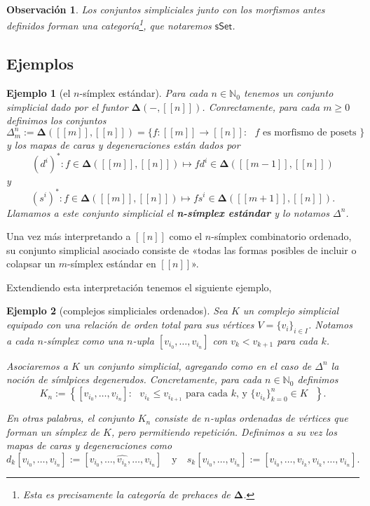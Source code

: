 \documentclass[11pt]{report}
\theoremstyle{colored}
\newtheorem{remark}{Observación}[section]
\newtheorem{example}{Ejemplo}[section]
\newcommand{\N}{\mathbb{N}}
\newcommand{\nat}[1]{[\![#1]\!]}
\newcommand{\ord}[1]{\nat{#1}}
\newcommand{\cat}[1]{\mathsf{#1}}
\renewcommand{\ss}[1]{\Delta^{#1}}
\newcommand{\ordcat}{\boldsymbol{\Delta}}
\begin{document}
\begin{remark} Los conjuntos simpliciales junto con los morfismos antes definidos forman una categoría\footnote{Esta es precisamente la categoría de prehaces de $\ordcat$.}, que notaremos $\cat{sSet}$.
\end{remark}

\subsection{Ejemplos}

\begin{example}[el $n$-símplex estándar] Para cada $n \in \N_0$ tenemos un conjunto simplicial dado por el funtor $\ordcat(-,\ord{n})$. Conrectamente, para cada $m \geq 0$ definimos los conjuntos
\[
\ss{n}_m := \ordcat(\ord{m},\ord{n}) = \{f : \ord{m} \to \ord{n} : \text{ $f$ es morfismo de posets } \}
\]
y los mapas de caras y degeneraciones están dados por
\[
(d^i)^* : f \in \ordcat(\ord{m},\ord{n}) \mapsto fd^i \in \ordcat(\ord{m-1},\ord{n})
\]
y
\[
(s^i)^* : f \in \ordcat(\ord{m},\ord{n}) \mapsto fs^i \in \ordcat(\ord{m+1},\ord{n}).
\]
Llamamos a este conjunto simplicial el \textbf{n-símplex estándar} y lo notamos $\ss{n}$.
\end{example}

Una vez más interpretando a $\ord{n}$ como el $n$-símplex combinatorio ordenado, su conjunto simplicial asociado consiste de «todas las formas posibles de incluir o colapsar un $m$-símplex estándar en $\nat{n}$».

Extendiendo esta interpretación tenemos el siguiente ejemplo,

\begin{example}[complejos simpliciales ordenados] Sea $K$ un complejo simplicial equipado con una relación de orden total para sus vértices $V = \{v_i\}_{i \in I}$. Notamos a cada $n$-símplex como una $n$-upla $[v_{i_0},\dots, v_{i_n}]$ con $v_k < v_{k+1}$ para cada $k$.

Asociaremos a $K$ un conjunto simplicial, agregando como en el caso de $\ss{n}$ la noción de \textit{símlpices degenerados}. Concretamente, para cada $n \in \N_0$ definimos
\[
K_n := \left\{[v_{i_0}, \dots, v_{i_n}] : \text{ $v_{i_k} \leq v_{i_{k+1}}$ para cada $k$, y $\{v_{i_k}\}_{k = 0}^n \in K$ }\right\}.
\]

En otras palabras, el conjunto $K_n$ consiste de $n$-uplas ordenadas de vértices que forman un símplex de $K$, pero permitiendo repetición. Definimos a su vez los mapas de caras y degeneraciones como
\[
d_k[v_{i_0}, \dots, v_{i_n}] := [v_{i_0},\dots,\widehat{v_{i_k}},\dots, v_{i_n}] \quad \text{y} \quad
s_k[v_{i_0}, \dots, v_{i_n}] := [v_{i_0},\dots,v_{i_k},v_{i_k}, \dots, v_{i_n}].
\]
\end{example}
\end{document}
